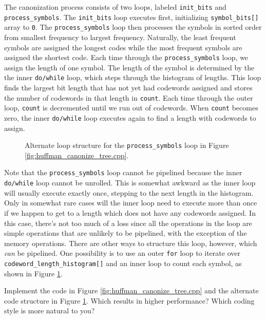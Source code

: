 The canonization process consists of two loops, labeled \lstinline{init_bits} and \lstinline{process_symbols}.  The \lstinline{init_bits} loop executes first, initializing \lstinline{symbol_bits[]} array to \lstinline{0}. The \lstinline{process_symbols} loop then processes the symbols in sorted order from smallest frequency to largest frequency. Naturally, the least frequent symbols are assigned the longest codes while the most frequent symbols are assigned the shortest code.  Each time through the \lstinline{process_symbols} loop, we assign the length of one symbol.  The length of the symbol is determined by the the inner \lstinline{do/while} loop, which steps through the histogram of lengths. This loop finds the largest bit length that has not yet had codewords assigned and stores the number of codewords in that length in \lstinline{count}. Each time through the outer loop, \lstinline{count} is decremented until we run out of codewords.  When \lstinline{count} becomes zero, the inner \lstinline{do/while} loop executes again to find a length with codewords to assign.

\begin{figure}

\caption{ Alternate loop structure for the \lstinline{process_symbols} loop in Figure \ref{fig:huffman_canonize_tree.cpp}. }
\label{fig:huffman_canonize_alternate}
\end{figure}

Note that the \lstinline{process_symbols} loop cannot be pipelined because the inner \lstinline{do/while} loop cannot be unrolled.  This is somewhat awkward as the inner loop will usually execute exactly once, stepping to the next length in the histogram.  Only in somewhat rare cases will the inner loop need to execute more than once if we happen to get to a length which does not have any codewords assigned.  In this case, there's not too much of a loss since all the operations in the loop are simple operations that are unlikely to be pipelined, with the exception of the memory operations.  There are other ways to structure this loop, however, which {\em can} be pipelined.  One possibility is to use an outer \lstinline{for} loop to iterate over \lstinline{codeword_length_histogram[]} and an inner loop to count each symbol, as shown in Figure \ref{fig:huffman_canonize_alternate}.

\begin{exercise}
Implement the code in Figure \ref{fig:huffman_canonize_tree.cpp} and the alternate code structure in Figure \ref{fig:huffman_canonize_alternate}.  Which results in higher performance?  Which coding style is more natural to you?
\end{exercise}

